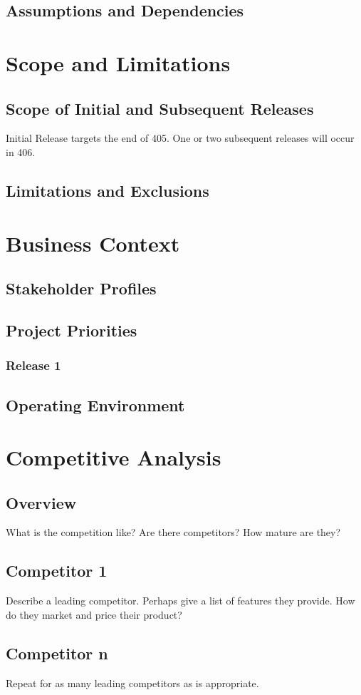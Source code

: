 \documentclass[12pt,oneside,letterpaper]{article}
\begin{document}
\subsection{Assumptions and Dependencies}

\section{Scope and Limitations}
\subsection{Scope of Initial and Subsequent Releases}
Initial Release targets the end of 405.  One or two subsequent releases will occur in 406.
\subsection{Limitations and Exclusions}

\section{Business Context}
\subsection{Stakeholder Profiles}
\subsection{Project Priorities}
\subsubsection{Release 1}
\subsection{Operating Environment}

\section{Competitive Analysis}
\subsection{Overview}
What is the competition like?  Are there competitors?  How mature are they?  
\subsection{Competitor 1}
Describe a leading competitor.  Perhaps give a list of features they provide.  How do they market and price their product?
\subsection{Competitor n}
Repeat for as many leading competitors as is appropriate.
\end{document}
